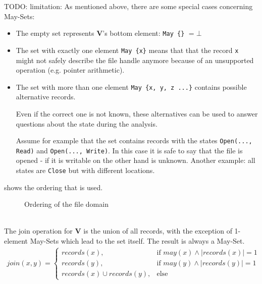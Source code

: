 TODO: limitation:
As mentioned above, there are some special cases concerning May-Sets:
\begin{itemize}
\item The empty set represents \textbf{V}'s bottom element: \verb|May {}| $ = \bot$
\item The set with exactly one element \verb|May {x}| means that that the record \verb|x| might not safely describe the file handle anymore because of an unsupported operation (e.g. pointer arithmetic).
\item The set with more than one element \verb|May {x, y, z ...}| contains possible alternative records. 

Even if the correct one is not known, these alternatives can be used to answer questions about the state during the analysis.

Assume for example that the set contains records with the states \verb|Open(..., Read)| and \verb|Open(..., Write)|. In this case it is safe to say that the file is opened - if it is writable on the other hand is unknown. Another example: all states are \verb|Close| but with different locations. %
\end{itemize}
 shows the ordering that is used.
\begin{figure}[ht]
  \centering
{}
  \caption{Ordering of the file domain}
  \label{fig:fileDomain}
\end{figure}\\
The join operation for \textbf{V} is the union of all records, with the exception of 1-element May-Sets which lead to the set itself. The result is always a May-Set.
\begin{align*}
join(x,y)=\left\{\begin{array}{cl}
records(x), & \mbox{if }may(x) \wedge |records(x)|=1\\
records(y), & \mbox{if }may(y) \wedge |records(y)|=1\\
records(x) \cup records(y), & \mbox{else} \end{array}\right.
\end{align*}


